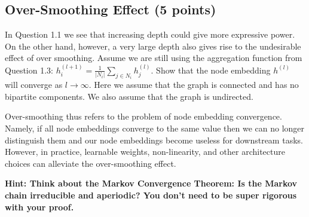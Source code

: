 \documentclass{article}
\numberwithin{figure}{section}
\begin{document}
\subsection{Over-Smoothing Effect (5 points)}

In Question 1.1 we see that increasing depth could give more expressive power.
On the other hand, however, a very large depth also gives rise to the undesirable
effect of over smoothing. Assume we are still using the aggregation function
from Question 1.3: $h^{(l+1)}_i = \frac{1}{|N_i|} \sum_{j \in N_i} h^{(l)}_j$. Show that the node embedding $h^{(l)}$ will converge as $l \rightarrow \infty$. Here we assume that the graph is connected and has no bipartite components. We also assume that the graph is undirected.

Over-smoothing thus refers to the problem of node embedding convergence. Namely, if all node embeddings converge to the same value then we can no longer distinguish them and our node embeddings become useless for downstream tasks. However, in practice, learnable weights, non-linearity, and other architecture choices can alleviate the over-smoothing effect.

\textbf{Hint: Think about the Markov Convergence Theorem: Is the Markov chain irreducible and aperiodic? You don’t need to be super rigorous with your proof.}
\end{document}
